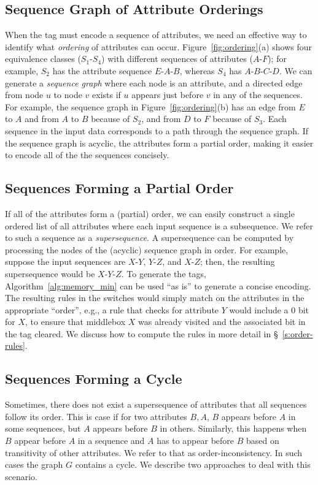 \subsection{Sequence Graph of Attribute Orderings}
When the tag must encode a sequence of attributes, we need an effective way to identify what \emph{ordering} of attributes can occur.  Figure~\ref{fig:ordering}(a) shows four equivalence classes ($S_1$-$S_4$) with different sequences of attributes ($A$-$F$); for example, $S_2$ has the attribute sequence $E$-$A$-$B$, whereas $S_4$ has $A$-$B$-$C$-$D$.  We can generate a \emph{sequence graph} where each node is an attribute, and a directed edge from node $u$ to node $v$ exists if $u$ appears just before $v$ in any of the sequences.  For example, the sequence graph in Figure~\ref{fig:ordering}(b) has an edge from $E$ to $A$ and from $A$ to $B$ because of $S_2$, and from $D$ to $F$ because of $S_3$.  Each sequence in the input data corresponds to a path through the sequence graph.  If the sequence graph is acyclic, the attributes form a partial order, making it easier to encode all of the the sequences concisely.

\subsection{Sequences Forming a Partial Order}
If all of the attributes form a (partial) order, we can easily construct a single ordered list of all attributes where each input sequence is a subsequence. We refer to such a sequence as a \emph{supersequence}.  A supersequence can be computed by processing the nodes of the (acyclic) sequence graph in order. For example, suppose the input sequences are $X$-$Y$, $Y$-$Z$, and $X$-$Z$; then, the resulting supersequence would be $X$-$Y$-$Z$. To generate the tags, Algorithm~\ref{alg:memory_min}
can be used ``as is'' to generate a concise encoding.  The resulting rules in the switches would simply match on the attributes
in the appropriate ``order'', e.g., a rule that checks for attribute $Y$ would include a $0$ bit for $X$, to ensure that middlebox $X$ was already visited and the associated bit in the tag cleared.  We discuss how to compute the rules in more detail in \S~\ref{s:order-rules}.

\subsection{Sequences Forming a Cycle}
Sometimes, there does not exist a supersequence of attributes that all sequences follow its order. This is case  if for two attributes $B, A$,  $B$ appears before $A$ in some sequences, but $A$ appears before $B$ in others. Similarly, this happens when $B$ appear before $A$ in a sequence and $A$ has to appear before $B$ based on transitivity of other attributes. We refer to that as order-inconsistency.  In such cases the graph $G$ contains a cycle. We describe two approaches to deal with this scenario. 

